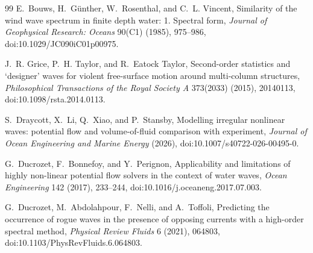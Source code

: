 \documentclass[10pt]{article}
\begin{document}
{\begin{thebibliography}{99}
E.~Bouws, H.~G\"unther, W.~Rosenthal, and C.~L. Vincent,
\newblock Similarity of the wind wave spectrum in finite depth water:
1. Spectral form,
\newblock \emph{Journal of Geophysical Research: Oceans} 90(C1) (1985),
975--986,
\newblock doi:10.1029/JC090iC01p00975.

J.~R. Grice, P.~H. Taylor, and R.~Eatock Taylor,
\newblock Second-order statistics and `designer' waves for violent
free-surface motion around multi-column structures,
\newblock \emph{Philosophical Transactions of the Royal Society A} 373(2033)
(2015), 20140113,
\newblock doi:10.1098/rsta.2014.0113.

S.~Draycott, X.~Li, Q.~Xiao, and P.~Stansby,
\newblock Modelling irregular nonlinear waves: potential flow and
volume-of-fluid comparison with experiment,
\newblock \emph{Journal of Ocean Engineering and Marine Energy} (2026),
\newblock doi:10.1007/s40722-026-00495-0.

G.~Ducrozet, F.~Bonnefoy, and Y.~Perignon,
\newblock Applicability and limitations of highly non-linear potential flow
solvers in the context of water waves,
\newblock \emph{Ocean Engineering} 142 (2017), 233--244,
\newblock doi:10.1016/j.oceaneng.2017.07.003.

G.~Ducrozet, M.~Abdolahpour, F.~Nelli, and A.~Toffoli,
\newblock Predicting the occurrence of rogue waves in the presence of
opposing currents with a high-order spectral method,
\newblock \emph{Physical Review Fluids} 6 (2021), 064803,
\newblock doi:10.1103/PhysRevFluids.6.064803.

\end{thebibliography}
}
\end{document}
